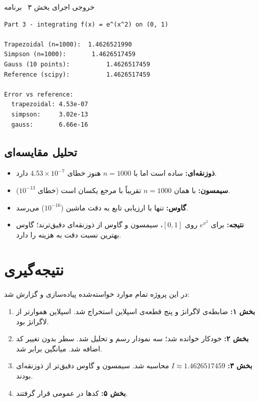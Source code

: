 \documentclass[a4paper,12pt,oneside]{report}
\newcommand{\listingtitle}[1]{%
  \refstepcounter{lstlisting}%
  \par\vspace{0.5em}%
  \begin{center}%
  {\small\bfseries\color{autblue}\begin{RTL}#1 \textendash\ برنامه~\thelstlisting\end{RTL}}%
  \end{center}%
  \vspace{0.3em}%
}
\begin{document}
\listingtitle{خروجی اجرای بخش ۳}
\begin{LTR}
\begin{lstlisting}[style=outputstyle]
Part 3 - integrating f(x) = e^(x^2) on (0, 1)

Trapezoidal (n=1000):  1.4626521990
Simpson (n=1000):       1.4626517459
Gauss (10 points):          1.4626517459
Reference (scipy):          1.4626517459

Error vs reference:
  trapezoidal: 4.53e-07
  simpson:     3.02e-13
  gauss:       6.66e-16
\end{lstlisting}
\end{LTR}

\section{تحلیل مقایسه‌ای}
\begin{itemize}
  \item \textbf{ذوزنقه‌ای:} ساده است اما با $n=1000$ هنوز خطای $4.53\times10^{-7}$ دارد.
  \item \textbf{سیمسون:} با همان $n=1000$ تقریباً با مرجع یکسان است (خطای $10^{-13}$).
  \item \textbf{گاوس:} تنها با  ارزیابی تابع به دقت ماشین ($10^{-16}$) می‌رسد.
  \item \textbf{نتیجه:} برای $e^{x^2}$ روی $[0,1]$، سیمسون و گاوس از ذوزنقه‌ای دقیق‌ترند؛ گاوس بهترین نسبت دقت به هزینه را دارد.
\end{itemize}

\chapter{نتیجه‌گیری}
\label{ch:conclusion}

در این پروژه تمام موارد خواسته‌شده پیاده‌سازی و گزارش شد:

\begin{enumerate}
  \item \textbf{بخش ۱:} ضابطه‌ی لاگرانژ و پنج قطعه‌ی اسپلاین استخراج شد. اسپلاین هموارتر از لاگرانژ بود.
  \item \textbf{بخش ۲:}  خودکار خوانده شد؛ سه نمودار رسم و تحلیل شد. سطر  بدون تغییر کد اضافه شد. میانگین  برابر  شد.
  \item \textbf{بخش ۳:} $I \approx 1.4626517459$ محاسبه شد. سیمسون و گاوس دقیق‌تر از ذوزنقه‌ای بودند.
  \item \textbf{بخش ۵:} کدها در  عمومی  قرار گرفتند.
\end{enumerate}
\end{document}
